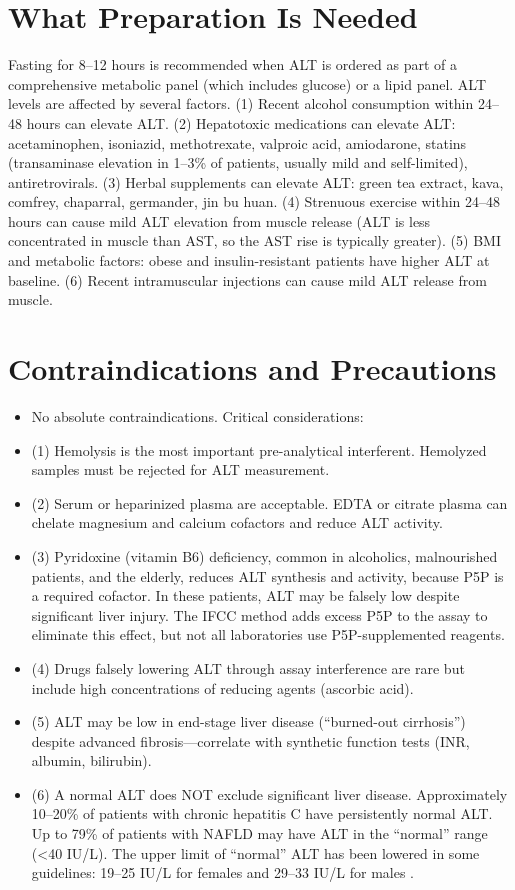 \section*{What Preparation Is Needed}
Fasting for 8--12 hours is recommended when ALT is ordered as part of a comprehensive metabolic panel (which includes glucose) or a lipid panel. ALT levels are affected by several factors. (1) Recent alcohol consumption within 24--48 hours can elevate ALT. (2) Hepatotoxic medications can elevate ALT: acetaminophen, isoniazid, methotrexate, valproic acid, amiodarone, statins (transaminase elevation in 1--3\% of patients, usually mild and self-limited), antiretrovirals. (3) Herbal supplements can elevate ALT: green tea extract, kava, comfrey, chaparral, germander, jin bu huan. (4) Strenuous exercise within 24--48 hours can cause mild ALT elevation from muscle release (ALT is less concentrated in muscle than AST, so the AST rise is typically greater). (5) BMI and metabolic factors: obese and insulin-resistant patients have higher ALT at baseline. (6) Recent intramuscular injections can cause mild ALT release from muscle.

\section*{Contraindications and Precautions}
\begin{itemize}
  \item No absolute contraindications. Critical considerations:
  \item (1) Hemolysis is the most important pre-analytical interferent. Hemolyzed samples must be rejected for ALT measurement.
  \item (2) Serum or heparinized plasma are acceptable. EDTA or citrate plasma can chelate magnesium and calcium cofactors and reduce ALT activity.
  \item (3) Pyridoxine (vitamin B6) deficiency, common in alcoholics, malnourished patients, and the elderly, reduces ALT synthesis and activity, because P5P is a required cofactor. In these patients, ALT may be falsely low despite significant liver injury. The IFCC method adds excess P5P to the assay to eliminate this effect, but not all laboratories use P5P-supplemented reagents.
  \item (4) Drugs falsely lowering ALT through assay interference are rare but include high concentrations of reducing agents (ascorbic acid).
  \item (5) ALT may be low in end-stage liver disease (``burned-out cirrhosis'') despite advanced fibrosis---correlate with synthetic function tests (INR, albumin, bilirubin).
  \item (6) A normal ALT does NOT exclude significant liver disease. Approximately 10--20\% of patients with chronic hepatitis C have persistently normal ALT. Up to 79\% of patients with NAFLD may have ALT in the ``normal'' range (<40 IU/L). The upper limit of ``normal'' ALT has been lowered in some guidelines: 19--25 IU/L for females and 29--33 IU/L for males \cite{prati2002updated}.
\end{itemize}
